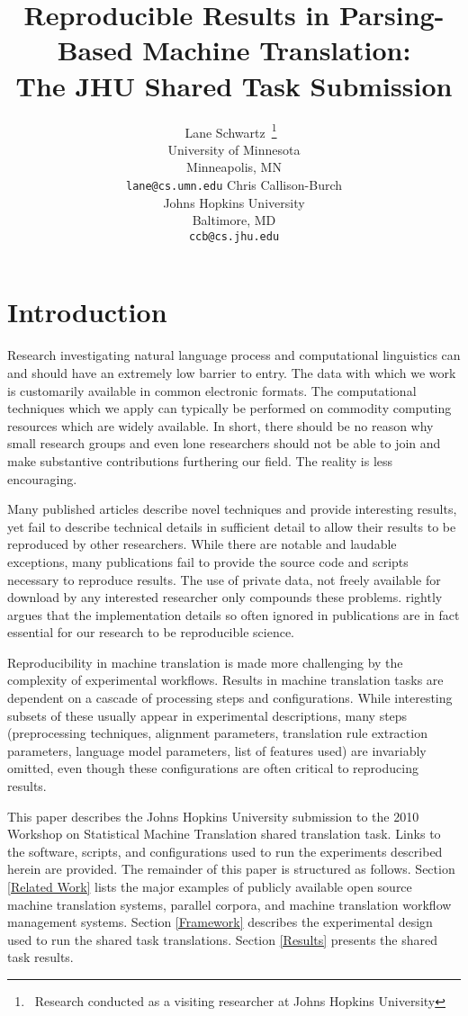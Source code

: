\documentclass[11pt]{article}
\title{Reproducible Results in Parsing-Based Machine Translation:\\
The JHU Shared Task Submission}
\author{Lane Schwartz\
\thanks{\ Research conducted as a visiting researcher at Johns Hopkins University}\
\\University of Minnesota\\Minneapolis, MN\\
{\tt lane@cs.umn.edu} \And
Chris Callison-Burch \\
Johns Hopkins University \\
Baltimore, MD\\
{\tt ccb@cs.jhu.edu}}
\date{}
\begin{document}
\maketitle

\begin{abstract}
\end{abstract}


\section{Introduction}

Research investigating natural language process and computational linguistics can and should have an extremely low barrier to entry. The data with which we work is customarily available in common electronic formats. The computational techniques which we apply can typically be performed on commodity computing resources which are widely available. In short, there should be no reason why small research groups and even lone researchers should not be able to join and make substantive contributions furthering our field.
%
The reality is less encouraging. 

Many published articles describe novel techniques and provide interesting results, yet fail to describe technical details in sufficient detail to allow their results to be reproduced by other researchers. While there are notable and laudable exceptions, many publications fail to provide the source code and scripts necessary to reproduce results. The use of private data, not freely available for download by any interested researcher only compounds these problems.  rightly argues that the implementation details so often ignored in publications are in fact essential for our research to be reproducible science.

Reproducibility in machine translation is made more challenging by the complexity of experimental workflows. Results in machine translation tasks are dependent on a cascade of processing steps and configurations. While interesting subsets of these usually appear in experimental descriptions, many steps (preprocessing techniques, alignment parameters, translation rule extraction parameters, language model parameters, list of features used) are invariably omitted, even though these configurations are often critical to reproducing results.

This paper describes the Johns Hopkins University submission to the 2010 Workshop on Statistical Machine Translation shared translation task. Links to the software, scripts, and configurations used to run the experiments described herein are provided. The remainder of this paper is structured as follows. Section \ref{Related Work} lists the major examples of publicly available open source machine translation systems, parallel corpora, and machine translation workflow management systems. Section \ref{Framework} describes the experimental design used to run the shared task translations. Section \ref{Results} presents the shared task results.
\end{document}
